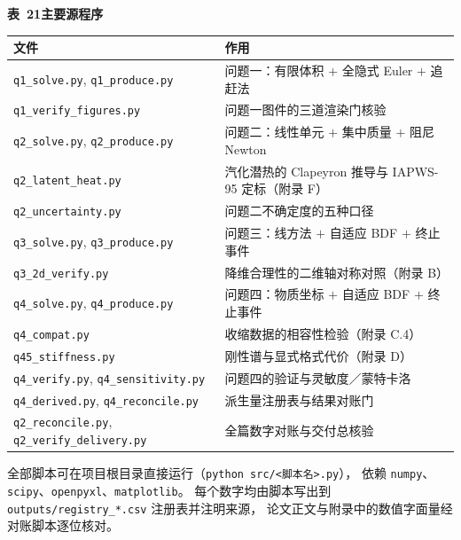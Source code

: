 \documentclass[withoutpreface,bwprint]{cumcmthesis} %
\begin{document}
\begin{appendices}
\begin{table}[htbp]
\centering
\begin{minipage}{0.94\textwidth}
\centering\small
\textbf{表~21\quad 主要源程序}\\[3pt]
\begin{tabular}{ll}
\toprule
文件 & 作用 \\
\midrule
\texttt{q1\_solve.py}, \texttt{q1\_produce.py} & 问题一：有限体积 $+$ 全隐式 Euler $+$ 追赶法 \\
\texttt{q1\_verify\_figures.py} & 问题一图件的三道渲染门核验 \\
\texttt{q2\_solve.py}, \texttt{q2\_produce.py} & 问题二：线性单元 $+$ 集中质量 $+$ 阻尼 Newton \\
\texttt{q2\_latent\_heat.py} & 汽化潜热的 Clapeyron 推导与 IAPWS-95 定标（附录 F） \\
\texttt{q2\_uncertainty.py} & 问题二不确定度的五种口径 \\
\texttt{q3\_solve.py}, \texttt{q3\_produce.py} & 问题三：线方法 $+$ 自适应 BDF $+$ 终止事件 \\
\texttt{q3\_2d\_verify.py} & 降维合理性的二维轴对称对照（附录 B） \\
\texttt{q4\_solve.py}, \texttt{q4\_produce.py} & 问题四：物质坐标 $+$ 自适应 BDF $+$ 终止事件 \\
\texttt{q4\_compat.py} & 收缩数据的相容性检验（附录 C.4） \\
\texttt{q45\_stiffness.py} & 刚性谱与显式格式代价（附录 D） \\
\texttt{q4\_verify.py}, \texttt{q4\_sensitivity.py} & 问题四的验证与灵敏度／蒙特卡洛 \\
\texttt{q4\_derived.py}, \texttt{q4\_reconcile.py} & 派生量注册表与结果对账门 \\
\texttt{q2\_reconcile.py}, \texttt{q2\_verify\_delivery.py} & 全篇数字对账与交付总核验 \\
\bottomrule
\end{tabular}
\end{minipage}
\end{table}

\noindent 全部脚本可在项目根目录直接运行（\texttt{python src/<脚本名>.py}），
依赖 \texttt{numpy}、\texttt{scipy}、\texttt{openpyxl}、\texttt{matplotlib}。
每个数字均由脚本写出到 \texttt{outputs/registry\_*.csv} 注册表并注明来源，
论文正文与附录中的数值字面量经对账脚本逐位核对。

\end{appendices}
\end{document}
